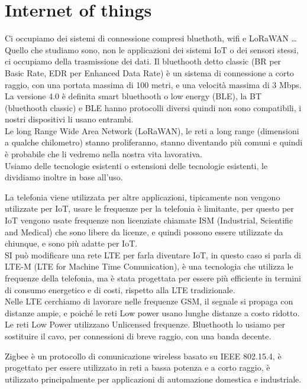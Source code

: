 \section{Internet of things}
Ci occupiamo dei sistemi di connessione compresi bluethoth, wifi e LoRaWAN \dots\\
Quello che studiamo sono, non le applicazioni dei sistemi IoT o dei sensori stessi, ci occupiamo della trasmissione dei dati.
Il bluethooth detto classic (BR per Basic Rate, EDR per Enhanced Data Rate) è un sistema di connessione a corto raggio, con una portata massima di 100 metri, e una velocità massima di 3 Mbps. La versione 4.0 è definita smart bluethooth o low energy (BLE), la BT (bluethooth classic) e BLE hanno protocolli diversi quindi non sono compatibili, i nostri dispositivi li usano entrambi.\\

Le long Range Wide Area Network (LoRaWAN), le reti a long range (dimensioni a qualche chilometro) stanno proliferanno, stanno diventando più comuni e quindi è probabile che li vedremo nella nostra vita lavorativa.\\

Usiamo delle tecnologie esistenti o estensioni delle tecnologie esistenti, le dividiamo inoltre in base all'uso.

La telefonia viene utilizzata per altre applicazioni, tipicamente non vengono utilizzate per IoT, usare le frequenze per la telefonia è limitante, per questo per IoT vengono usate frequenze non licenziate chiamate ISM (Industrial, Scientific and Medical) che sono libere da licenze, e quindi possono essere utilizzate da chiunque, e sono più adatte per IoT.\\

SI può modificare una rete LTE per farla diventare IoT, in questo caso si parla di LTE-M (LTE for Machine Time Comunication), è una tecnologia che utilizza le frequenze della telefonia, ma è stata progettata per essere più efficiente in termini di consumo energetico e di costi, rispetto alla LTE tradizionale.\\

Nelle LTE cerchiamo di lavorare nelle frequenze GSM, il segnale si propaga con distanze ampie, e poiché le reti Low power usano lunghe distanze a costo ridotto.\\
Le reti Low Power utilizzano Unlicensed frequenze.
Bluethooth lo usiamo per sostituire il cavo, per connessioni di breve raggio, con una banda decente. 

Zigbee è un protocollo di comunicazione wireless basato su IEEE 802.15.4, è progettato per essere utilizzato in reti a bassa potenza e a corto raggio, è utilizzato principalmente per applicazioni di automazione domestica e industriale.\\

